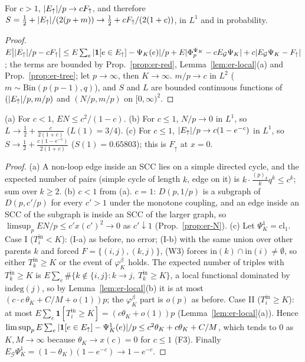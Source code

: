 \begin{theorem}[$S$, $c>1$]\label{thm:er-S}
For $c>1$, $|E_{\uparrow}|/p\to cF_\uparrow$, and therefore
$S=\tfrac12+|E_{\uparrow}|/(2(p+m))\to\tfrac12+cF_\uparrow/(2(1+c))$, in $L^1$ and in
probability.
\end{theorem}
\begin{proof}
$E\big||E_{\uparrow}|/p-cF_\uparrow\big|\le E\sum_e|\mathbf 1[e\in E_{\uparrow}]-\Psi_K(e)|/p+E|\Phi^{\Psi_K}_p-cE_{\mathcal G}\Psi_K|+c|E_{\mathcal G}\Psi_K-F_\uparrow|$;
the terms are bounded by Prop.~\ref{prop:er-red}, Lemma~\ref{lem:er-local}(a) and
Prop.~\ref{prop:er-tree}; let $p\to\infty$, then $K\to\infty$. $m/p\to c$ in
$L^2$ ($m\sim\mathrm{Bin}(p(p-1),q)$), and $S$ and $L$ are bounded continuous
functions of $(|E_{\uparrow}|/p,m/p)$ and $(N/p,m/p)$ on $[0,\infty)^2$.
\end{proof}

\begin{proposition}[$c\le1$]\label{prop:er-sub}
(a) For $c<1$, $EN\le c^2/(1-c)$. (b) For $c\le1$, $N/p\to0$ in $L^1$, so
$L\to\tfrac12+\frac{c}{2(1+c)}$ ($L(1)=3/4$). (c) For $c\le1$,
$|E_{\uparrow}|/p\to c(1-e^{-c})$ in $L^1$, so $S\to\tfrac12+\frac{c(1-e^{-c})}{2(1+c)}$
($S(1)=0.65803$); this is $F_\uparrow$ at $x=0$.
\end{proposition}
\begin{proof}
(a) A non-loop edge inside an SCC lies on a simple directed cycle, and the
expected number of pairs (simple cycle of length $k$, edge on it) is
$k\cdot\frac{(p)_k}{k}q^k\le c^k$; sum over $k\ge2$.
(b) $c<1$ from (a). $c=1$: $D(p,1/p)$ is a subgraph of $D(p,c'/p)$ for every
$c'>1$ under the monotone coupling, and an edge inside an SCC of the subgraph is
inside an SCC of the larger graph, so $\limsup_pEN/p\le c'x(c')^2\to0$ as
$c'\downarrow1$ (Prop.~\ref{prop:er-N}).
(c) Let $\Psi^1_K=\mathrm{cl}_1$. Case I ($T^{\mathrm{in}}_i<K$): (I-a) as before,
no error; (I-b) with the same union over other parents $k$ and forced
$F=\{(i,j),(k,j)\}$, (W3) forces $\mathrm{in}(k)\cap\mathrm{in}(i)\ne\emptyset$,
so either $T^{\mathrm{in}}_k\ge K$ or the event of $\varphi^\beta_K$ holds. The
expected number of triples with $T^{\mathrm{in}}_k\ge K$ is
$E\sum_e\#\{k\notin\{i,j\}:k\to j,\ T^{\mathrm{in}}_k\ge K\}$, a local functional
dominated by $\mathrm{indeg}(j)$, so by Lemma~\ref{lem:er-local}(b) it is at most
$(c\cdot c\,\theta_K+C/M+o(1))p$; the $\varphi^\beta_K$ part is $o(p)$ as before.
Case II ($T^{\mathrm{in}}_i\ge K$): at most $E\sum_e\mathbf 1[T^{\mathrm{in}}_i\ge K]=(c\theta_K+o(1))p$
(Lemma~\ref{lem:er-local}(a)). Hence
$\limsup_pE\sum_e|\mathbf 1[e\in E_{\uparrow}]-\Psi^1_K(e)|/p\le c^2\theta_K+c\theta_K+C/M$, which
tends to $0$ as $K,M\to\infty$ because $\theta_K\to x(c)=0$ for $c\le1$ (F3).
Finally $E_{\mathcal G}\Psi^1_K=(1-\theta_K)(1-e^{-c})\to1-e^{-c}$.
\end{proof}

